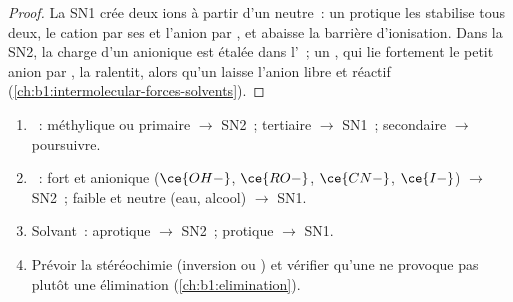 \begin{proof}
La SN1 crée deux ions à partir d'un  neutre~: un 
protique les stabilise tous deux, le cation par ses 
et l'anion par , et abaisse la barrière d'ionisation.
Dans la SN2, la charge d'un  anionique est étalée dans l'~; un , qui lie fortement le petit anion
par , la ralentit, alors qu'un 
laisse l'anion libre et réactif
(\cref{ch:b1:intermolecular-forces-solvents}).
\end{proof}

\begin{method}\label{met:b1:nucleophilic-substitution:choose-mechanism}
\begin{enumerate}
  \item {}~: méthylique ou primaire $\to$ SN2~; tertiaire $\to$
        SN1~; secondaire $\to$ poursuivre.
  \item {}~: fort et anionique ($\ce{OH-}$, $\ce{RO-}$,
        $\ce{CN-}$,
        $\ce{I-}$) $\to$ SN2~; faible et neutre (eau, alcool) $\to$ SN1.
  \item Solvant~: aprotique $\to$ SN2~; protique $\to$ SN1.
  \item Prévoir la stéréochimie (inversion ou ) et vérifier
        qu'une  ne provoque pas plutôt une élimination
        (\cref{ch:b1:elimination}).
\end{enumerate}
\end{method}

